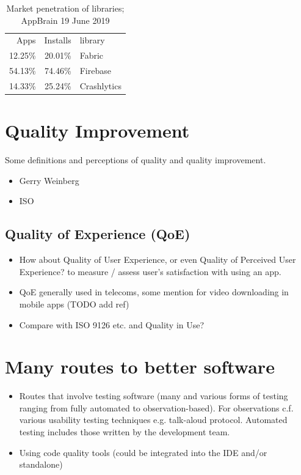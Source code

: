 \begin{table}[]
    \centering
    \begin{tabular}{r|r|l}
    Apps &Installs &library \\
    12.25\% &20.01\%  & Fabric \\
    54.13\% &74.46\%  & Firebase\\
    14.33\% &25.24\%  & Crashlytics
    \end{tabular}
    \caption{Market penetration of libraries; AppBrain 19 June 2019}
    \label{tab:appbrain_libraries_installed}
\end{table}

\section{Quality Improvement}
Some definitions and perceptions of quality and quality improvement.
\begin{itemize}
    \item Gerry Weinberg
    \item ISO
\end{itemize}

\subsection{Quality of Experience (QoE)}
\begin{itemize}
    \item How about Quality of User Experience, or even Quality of Perceived User Experience? to measure / assess user's satisfaction with using an app.
    \item QoE generally used in telecoms, some mention for video downloading in mobile apps (TODO add ref)
    \item Compare with ISO 9126 etc. and Quality in Use?
\end{itemize}

\section{Many routes to better software}

\begin{itemize}
    \item Routes that involve testing software (many and various forms of testing ranging from fully automated to observation-based). For observations c.f. various usability testing techniques e.g. talk-aloud protocol. Automated testing includes those written by the development team.
    \item Using code quality tools (could be integrated into the IDE and/or standalone)
\end{itemize}
